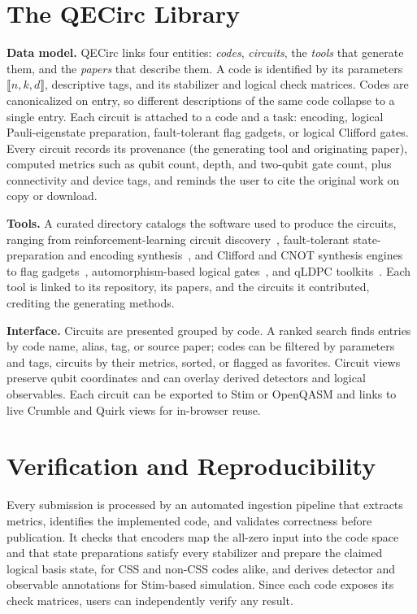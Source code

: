 \documentclass[conference]{IEEEtran}
\begin{document}
\section{The QECirc Library}
\textbf{Data model.} QECirc links four entities: \emph{codes}, \emph{circuits}, the \emph{tools} that generate them, and the \emph{papers} that describe them. A code is identified by its parameters $\llbracket n,k,d\rrbracket$, descriptive tags, and its stabilizer and logical check matrices. Codes are canonicalized on entry, so different descriptions of the same code collapse to a single entry. Each circuit is attached to a code and a task: encoding, logical Pauli-eigenstate preparation, fault-tolerant flag gadgets, or logical Clifford gates. Every circuit records its provenance (the generating tool and originating paper), computed metrics such as qubit count, depth, and two-qubit gate count, plus connectivity and device tags, and reminds the user to cite the original work on copy or download.

\textbf{Tools.} A curated directory catalogs the software used to produce the circuits, ranging from reinforcement-learning circuit discovery~\cite{ZOC+:25}, fault-tolerant state-preparation and encoding synthesis~\cite{PSB+:25, SPB+:25, PSWH:26}, and Clifford and CNOT synthesis engines~\cite{WKB:25, GMV:25, GM:24} to flag gadgets~\cite{FA:25}, automorphism-based logical gates~\cite{SKW+:24}, and qLDPC toolkits~\cite{KLY+:25}. Each tool is linked to its repository, its papers, and the circuits it contributed, crediting the generating methods.

\textbf{Interface.} Circuits are presented grouped by code. A ranked search finds entries by code name, alias, tag, or source paper; codes can be filtered by parameters and tags, circuits by their metrics, sorted, or flagged as favorites. Circuit views preserve qubit coordinates and can overlay derived detectors and logical observables. Each circuit can be exported to Stim or OpenQASM and links to live Crumble and Quirk views for in-browser reuse.

\section{Verification and Reproducibility}
Every submission is processed by an automated ingestion pipeline that extracts metrics, identifies the implemented code, and validates correctness before publication. It checks that encoders map the all-zero input into the code space and that state preparations satisfy every stabilizer and prepare the claimed logical basis state, for CSS and non-CSS codes alike, and derives detector and observable annotations for Stim-based simulation. Since each code exposes its check matrices, users can independently verify any result.
\end{document}
